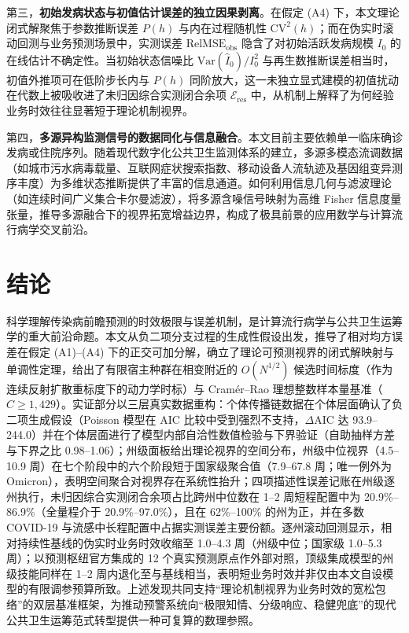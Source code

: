 \documentclass[11pt,a4paper]{article}
\theoremstyle{plain}
\theoremstyle{definition}
\begin{document}
第三，\textbf{初始发病状态与初值估计误差的独立因果剥离}。在假定 (A4) 下，本文理论闭式解聚焦于参数推断误差 $P(h)$ 与内在过程随机性 $\text{CV}^2(h)$；而在伪实时滚动回测与业务预测场景中，实测误差 $\text{RelMSE}_{\text{obs}}$ 隐含了对初始活跃发病规模 $I_0$ 的在线估计不确定性。当初始状态信噪比 $\text{Var}(\hat{I}_0)/I_0^2$ 与再生数推断误差相当时，初值外推项可在低阶步长内与 $P(h)$ 同阶放大，这一未独立显式建模的初值扰动在代数上被吸收进了未归因综合实测闭合余项 $\mathcal{E}_{\text{res}}$ 中，从机制上解释了为何经验业务时效往往显著短于理论机制视界。

第四，\textbf{多源异构监测信号的数据同化与信息融合}。本文目前主要依赖单一临床确诊发病或住院序列。随着现代数字化公共卫生监测体系的建立，多源多模态流调数据（如城市污水病毒载量、互联网症状搜索指数、移动设备人流轨迹及基因组变异测序丰度）为多维状态推断提供了丰富的信息通道。如何利用信息几何与滤波理论（如连续时间广义集合卡尔曼滤波），将多源含噪信号映射为高维 Fisher 信息度量张量，推导多源融合下的视界拓宽增益边界，构成了极具前景的应用数学与计算流行病学交叉前沿。

\section{结论}

科学理解传染病前瞻预测的时效极限与误差机制，是计算流行病学与公共卫生运筹学的重大前沿命题。本文从负二项分支过程的生成性假设出发，推导了相对均方误差在假定 (A1)--(A4) 下的正交可加分解，确立了理论可预测视界的闭式解映射与单调性定理，给出了有限宿主种群在相变附近的 $O(N^{1/2})$ 候选时间标度（作为连续反射扩散重标度下的动力学时标）与 Cram\'er--Rao 理想整数样本量基准（$C \ge 1{,}429$）。实证部分以三层真实数据重构：个体传播链数据在个体层面确认了负二项生成假设（Poisson 模型在 AIC 比较中受到强烈不支持，$\Delta\text{AIC}$ 达 93.9--244.0）并在个体层面进行了模型内部自洽性数值检验与下界验证（自助抽样方差与下界之比 0.98--1.06）；州级面板给出理论视界的空间分布，州级中位视界（4.5--10.9 周）在七个阶段中的六个阶段短于国家级聚合值（7.9--67.8 周；唯一例外为 Omicron），表明空间聚合对视界存在系统性抬升；四项描述性误差记账在州级逐州执行，未归因综合实测闭合余项占比跨州中位数在 1--2 周短程配置中为 20.9\%--86.9\%（全量程介于 20.9\%--97.0\%），且在 62\%--100\% 的州为正，并在多数 COVID-19 与流感中长程配置中占据实测误差主要份额。逐州滚动回测显示，相对持续性基线的伪实时业务时效收缩至 1.0--4.3 周（州级中位；国家级 1.0--5.3 周）；以预测枢纽官方集成的 12 个真实预测原点作外部对照，顶级集成模型的州级技能同样在 1--2 周内退化至与基线相当，表明短业务时效并非仅由本文自设模型的有限调参预算所致。上述发现共同支持“理论机制视界为业务时效的宽松包络”的双层基准框架，为推动预警系统向“极限知情、分级响应、稳健兜底”的现代公共卫生运筹范式转型提供一种可复算的数理参照。
\end{document}

